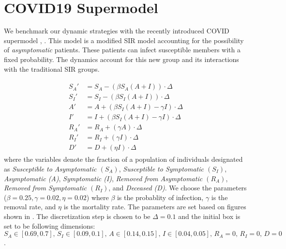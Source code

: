 \section{COVID19 Supermodel}
\label{sec:covid}
We benchmark our dynamic strategies with the recently introduced COVID supermodel \cite{ansumali2020modelling}, \cite{indiansuper2020supermodel}. This model is a modified SIR model accounting for the possibility of \emph{asymptomatic} patients. These patients can infect susceptible members with a fixed probability. The dynamics account for this new group and its interactions with the traditional SIR groups.

\begin{align}
  \label{eq:covid19_dynamics}
  \begin{split}
   S_A' & = S_A  -(\beta S_A(A+I))\cdot \Delta \\
   S_I' & = S_I  -(\beta S_I (A + I))\cdot \Delta \\
   A' & = A + (\beta S_I(A+I) - \gamma I)\cdot \Delta \\
   I' & = I + (\beta S_I (A+I) - \gamma I)\cdot  \Delta \\
   R_A' & = R_A + (\gamma A)\cdot \Delta \\
   R_I' & = R_I + (\gamma I)\cdot \Delta \\
   D' & = D + (\eta I)\cdot \Delta
  \end{split}
\end{align}
where the variables denote the fraction of a population of individuals designated as \emph{Susceptible to Asymptomatic $(S_A)$}, \emph{Susceptible to Symptomatic $(S_I)$}, \emph{Asymptomatic (A)}, \emph{Symptomatic (I)}, \emph{Removed from Asymptomatic $(R_A)$}, \emph{Removed from Symptomatic $(R_I)$}, and \emph{Deceased (D)}. We choose the parameters ($\beta = 0.25, \gamma=0.02, \eta=0.02$) where $\beta$ is the probablity of infection, $\gamma$ is the removal rate, and $\eta$ is the mortality rate. The parameters are set based on figures shown in \cite{ansumali2020modelling}. The discretization step is chosen to be $\Delta = 0.1$ and the initial box is set to be following dimensions: $S_A  \in [0.69, 0.7], \, S_I \in [0.09, 0.1], \, A \in [0.14, 0.15], \, I \in [0.04, 0.05], \, R_A  = 0,\, R_I  = 0, \, D  = 0$.

